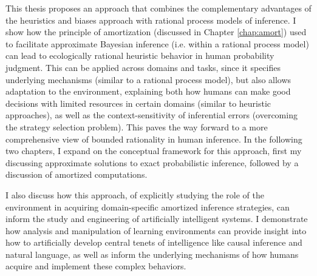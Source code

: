 This thesis proposes an approach that combines the complementary advantages of the heuristics and biases approach with rational process models of inference. I show how the principle of amortization (discussed in Chapter \ref{chap:amort}) used to facilitate approximate Bayesian inference (i.e. within a rational process model) can lead to ecologically rational heuristic behavior in human probability judgment. This can be applied across domains and tasks, since it specifies underlying mechanisms (similar to a rational process model), but also allows adaptation to the environment, explaining both how humans can make good decisions with limited resources in certain domains (similar to heuristic approaches), as well as the context-sensitivity of inferential errors (overcoming the strategy selection problem). This paves the way forward to a more comprehensive view of bounded rationality in human inference. In the following two chapters, I expand on the conceptual framework for this approach, first my discussing approximate solutions to exact probabilistic inference, followed by a discussion of amortized computations.

I also discuss how this approach, of explicitly studying the role of the environment in acquiring domain-specific amortized inference strategies, can inform the study and engineering of artificially intelligent systems. I demonstrate how analysis and manipulation of learning environments can provide insight into how to artificially develop central tenets of intelligence like causal inference and natural language, as well as inform the underlying mechanisms of how humans acquire and implement these complex behaviors.
